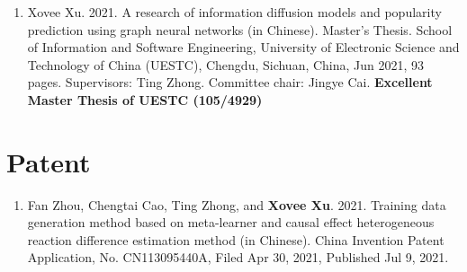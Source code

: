 
\begin{enumerate}
    \item Xovee Xu. 2021. A research of information diffusion models and popularity prediction using graph neural networks (in Chinese). Master's Thesis. School of Information and Software Engineering, University of Electronic Science and Technology of China (UESTC), Chengdu, Sichuan, China, Jun 2021, 93 pages. Supervisors: Ting Zhong. Committee chair: Jingye Cai. \newline
    \textbf{\color{red}Excellent Master Thesis of UESTC (105/4929)}
\end{enumerate}

\section*{Patent}

\begin{enumerate}
    \item Fan Zhou, Chengtai Cao, Ting Zhong, and \textbf{Xovee Xu}. 2021. Training data generation method based on meta-learner and causal effect heterogeneous reaction difference estimation method (in Chinese). China Invention Patent Application, No. CN113095440A, Filed Apr 30, 2021, Published Jul 9, 2021. 
\end{enumerate}
